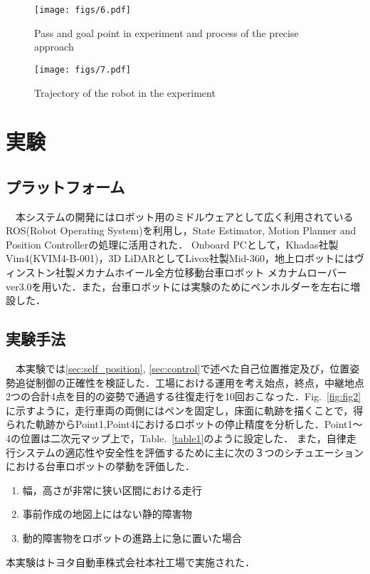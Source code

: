 \begin{figure}[!t]
\texttt{[image: figs/6.pdf]}
\caption{Pass and goal point in experiment and process of the precise approach}
\label{fig:fig6}
\end{figure}

\begin{figure}[!t]
\texttt{[image: figs/7.pdf]}
\caption{Trajectory of the robot in the experiment}
\label{fig:fig7}
\end{figure}

\section{実験}

\subsection{プラットフォーム}
　本システムの開発にはロボット用のミドルウェアとして広く利用されているROS(Robot Operating System)を利用し，State Estimator, Motion Planner and Position Controllerの処理に活用された．
Onboard PCとして，Khadas社製Vim4(KVIM4-B-001)，3D LiDARとしてLivox社製Mid-360，地上ロボットにはヴィンストン社製メカナムホイール全方位移動台車ロボット メカナムローバー ver3.0を用いた．また，台車ロボットには実験のためにペンホルダーを左右に増設した．

\subsection{実験手法}
　本実験では\ref{sec:self_position}, \ref{sec:control}で述べた自己位置推定及び，位置姿勢追従制御の正確性を検証した．工場における運用を考え始点，終点，中継地点2つの合計4点を目的の姿勢で通過する往復走行を10回おこなった．Fig.~\ref{fig:fig2}に示すように，走行車両の両側にはペンを固定し，床面に軌跡を描くことで，得られた軌跡からPoint1,Point4におけるロボットの停止精度を分析した．Point1〜4の位置は二次元マップ上で，Table.~\ref{table1}のように設定した．
また，自律走行システムの適応性や安全性を評価するために主に次の３つのシチュエーションにおける台車ロボットの挙動を評価した．
\begin{enumerate}[label=(\alph*)]
  \item 幅，高さが非常に狭い区間における走行
  \item 事前作成の地図上にはない静的障害物
  \item 動的障害物をロボットの進路上に急に置いた場合
\end{enumerate}
本実験はトヨタ自動車株式会社本社工場で実施された． 

